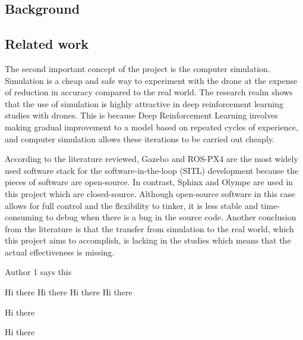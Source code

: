 \documentclass[../main.tex]{subfiles}
\begin{document}
\subsection{Background}

\blindtext

\subsection{Related work}



The second important concept of the project is the computer simulation.
Simulation is a cheap and safe way to experiment with the drone
at the expense of reduction in accuracy compared to the real world.
The research realm shows that the use of simulation is highly attractive
in deep reinforcement learning studies with drones.
This is because Deep Reinforcement Learning involves
making gradual improvement to a model based on 
repeated cycles of experience, and computer simulation 
allows these iterations to be carried out cheaply.

According to the literature reviewed, 
Gazebo and ROS-PX4 are the most widely used software stack 
for the software-in-the-loop (\textsc{SITL}) development
because the pieces of software are open-source. 
In contrast, Sphinx and Olympe are used in this project 
which are closed-source.
Although open-source software in this case 
allows for full control and the flexibility to tinker,
it is less stable and time-consuming to debug
when there is a bug in the source code.
Another conclusion from the literature is that 
the transfer from simulation to the real world,
which this project aims to accomplish,
is lacking in the studies 
which means that the actual effectiveness is missing.


Author 1 says this

Hi there \cite{Zho20}
Hi there \citet{Zho20}
Hi there \citep{Zho20}
Hi there \citeauthor{Zho20}

Hi there \cite{Wal19}

Hi there \cite{Gar20}



\blindtext
\end{document}
